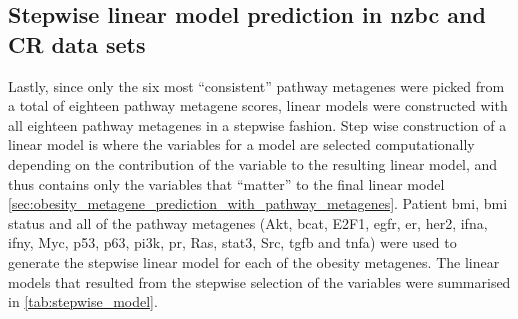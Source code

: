 \subsection{Stepwise linear model prediction in \gls{nzbc} and CR data sets}
\label{sub:stepwise_linear_model_prediction_in_nzbc_and_cr_data_sets}

Lastly, since only the six most ``consistent'' pathway metagenes were picked from a total of eighteen pathway metagene scores, linear models were constructed with all eighteen pathway metagenes in a stepwise fashion.
Step wise construction of a linear model is where the variables for a model are selected computationally depending on the contribution of the variable to the resulting linear model, and thus contains only the variables that ``matter'' to the final linear model \cref{sec:obesity_metagene_prediction_with_pathway_metagenes}.
Patient \gls{bmi}, \gls{bmi} status and all of the pathway metagenes (Akt, \gls{bcat}, E2F1, \gls{egfr}, \gls{er}, \gls{her2}, \gls{ifna}, \gls{ifny}, Myc, p53, p63, \gls{pi3k}, \gls{pr}, Ras, \gls{stat3}, Src, \gls{tgfb} and \gls{tnfa}) were used to generate the stepwise linear model for each of the obesity metagenes.
The linear models that resulted from the stepwise selection of the variables were summarised in \cref{tab:stepwise_model}.

